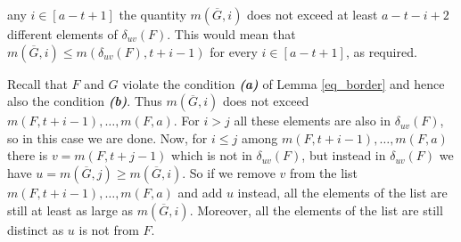 \documentclass[12pt]{article}
\let\leq\leqslant
\let\geq\geqslant
\let\le\leq
\let\ge\geq
\begin{document}
 any $i\in [a - t + 1]$ the quantity $m(\overline{G}, i)$ does not exceed at least $a - t - i + 2$ different elements of $\delta_{uv}(F)$. This would mean that $m(\overline{G}, i) \le m(\delta_{uv}(F), t + i - 1)$ for every $i\in [a - t + 1]$, as required.

Recall that $F$ and $G$ violate the condition \textbf{\emph{(a)}} of Lemma \ref{eq_border} and hence also the condition \textbf{\emph{(b)}}. Thus $m(\overline{G}, i)$  does not exceed  $m(F, t + i - 1), \ldots, m(F, a)$. For $i > j$ all these elements are also in $\delta_{uv}(F)$, so in this case we are done. Now, for $i \le j$ among  $m(F, t + i - 1), \ldots, m(F, a)$ there is $v = m(F, t + j - 1)$ which is not in $\delta_{uv}(F)$, but instead in $\delta_{uv}(F)$ we have $u = m(\overline{G}, j) \ge m(\overline{G}, i)$. So if we remove $v$ from the list  $m(F, t + i - 1), \ldots, m(F, a)$ and add $u$ instead, all the elements of the list are still at least as large as $m(\overline{G}, i)$. Moreover, all the elements of the list are still distinct as $u$ is not from $F$.

%
\end{document}
